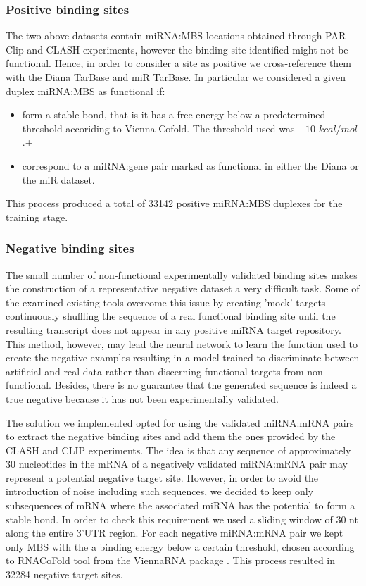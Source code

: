 \subsubsection{Positive binding sites}
The two above datasets contain miRNA:MBS locations obtained through PAR-Clip \cite{parclip}  and CLASH \cite{clash}  experiments, however the binding site identified might not be functional. Hence, in order to consider a site as positive we cross-reference them with the Diana TarBase and miR TarBase. In particular we considered a given duplex miRNA:MBS as functional if:
\begin{itemize}
	\item form a stable bond, that is it has a free energy below a predetermined threshold accoriding to Vienna Cofold. The threshold used was $-10$ $kcal/mol$.+
	\item correspond to a miRNA:gene pair marked as functional in either the Diana or the miR dataset.
\end{itemize} 
This process produced a total of 33142 positive miRNA:MBS duplexes for the training stage.

\subsubsection{Negative binding sites}
The small number of non-functional experimentally validated binding sites makes 
the construction of a representative negative dataset a very difficult task. Some of the examined existing tools overcome this issue by creating 'mock' targets \cite{mirmark} continuously shuffling the sequence of a real functional binding site until the resulting transcript does not appear in any positive miRNA target repository. This method, however, may lead the neural network to learn the function used to create the negative examples resulting in a model trained to discriminate between artificial and real data rather than discerning functional targets from non-functional. Besides, there is no guarantee that the generated sequence is indeed a true negative because it has not been experimentally validated.

The solution we implemented opted for using the validated miRNA:mRNA pairs to extract the negative binding sites and add them the ones provided by the CLASH and CLIP experiments. The idea is that any sequence of approximately 30 nucleotides in the mRNA of a negatively validated miRNA:mRNA pair may represent a potential negative target site. However, in order to avoid the introduction of noise including such sequences, we decided to keep only subsequences of mRNA where the associated miRNA has the potential to form a stable bond. In order to check this requirement we used a sliding window of 30 nt along the entire 3'UTR region. For each negative miRNA:mRNA pair we kept only  MBS with the a binding energy below a certain threshold, chosen according to RNACoFold tool from the ViennaRNA package \cite{vienna_rna}. This process resulted in 32284 negative target sites. 

